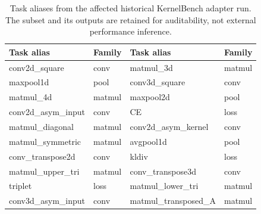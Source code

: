 \begin{table}[htbp]
\centering
\caption{Task aliases from the affected historical KernelBench adapter run. The subset and its outputs are retained for auditability, not external performance inference.}
\label{tab:kernelbench-task-appendix}
\scriptsize
\begin{tabularx}{\linewidth}{l l l l}
\toprule
Task alias & Family & Task alias & Family \\
\midrule
conv2d\_square & conv & matmul\_3d & matmul \\
maxpool1d & pool & conv3d\_square & conv \\
matmul\_4d & matmul & maxpool2d & pool \\
conv2d\_asym\_input & conv & CE & loss \\
matmul\_diagonal & matmul & conv2d\_asym\_kernel & conv \\
matmul\_symmetric & matmul & avgpool1d & pool \\
conv\_transpose2d & conv & kldiv & loss \\
matmul\_upper\_tri & matmul & conv\_transpose3d & conv \\
triplet & loss & matmul\_lower\_tri & matmul \\
conv3d\_asym\_input & conv & matmul\_transposed\_A & matmul \\
\bottomrule
\end{tabularx}
\end{table}
